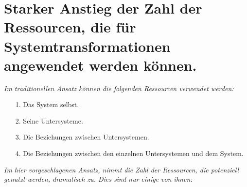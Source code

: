 \documentclass[11pt,a4paper]{article}
\begin{document}
\section*{Starker Anstieg der Zahl der Ressourcen, die für
  Systemtransformationen angewendet werden können.} 

\emph{Im traditionellen Ansatz können die folgenden Ressourcen verwendet
  werden:}
\begin{itemize}\itemsep0pt
\item[1.] Das System selbst.
\item[2.] Seine Untersysteme.
\item[3.] Die Beziehungen zwischen Untersystemen.
\item[4.] Die Beziehungen zwischen den einzelnen Untersystemen und dem System.
\end{itemize}
\emph{Im hier vorgeschlagenen Ansatz, nimmt die Zahl der Ressourcen, die
  potenziell genutzt werden, dramatisch zu. Dies sind nur einige von ihnen: }
\end{document}
